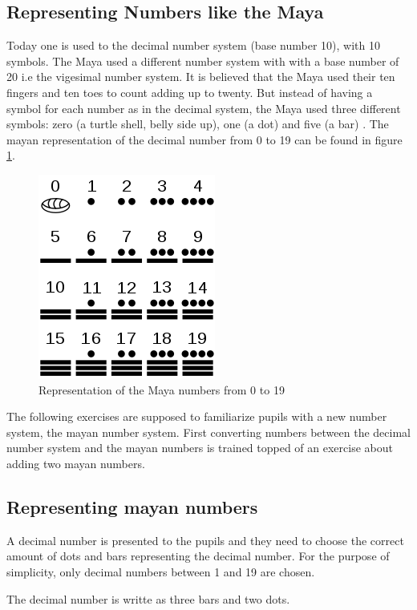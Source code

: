 \subsection{Representing Numbers like the Maya}

Today one is used to the decimal number system (base number 10), with 10 symbols. The Maya used a different number system with with a base number of 20 i.e the vigesimal number system. It is believed that the Maya used their ten fingers and ten toes to count adding up to twenty. But instead of having a symbol for each number as in the decimal system, the Maya used three different symbols: zero (a turtle shell, belly side up), one (a dot) and five (a bar) \cite{Maya}. The mayan representation of the decimal number from 0 to 19 can be found in figure \ref{fig:maya_numerals}.

\begin{figure} 
    \centering
    \includegraphics[width=0.3 \columnwidth]{figures/maya_number_system.png}
    \caption{Representation of the Maya numbers from 0 to 19} 
    \label{fig:maya_numerals} 
\end{figure}

The following exercises are supposed to familiarize pupils with a new number system, the mayan number system. First converting numbers between the decimal number system and the mayan numbers is trained topped of an exercise about adding two mayan numbers.

\subsection*{Representing mayan numbers}

A decimal number is presented to the pupils and they need to choose the correct amount of dots and bars representing the decimal number. For the purpose of simplicity, only decimal numbers between 1 and 19 are chosen.

\begin{example}
    The decimal number  is writte as three bars and two dots.
\end{example}

